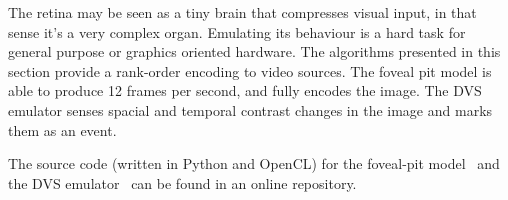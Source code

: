 The retina may be seen as a tiny brain that compresses visual input, in that sense it's a very complex organ. Emulating its behaviour is a hard task for general purpose or graphics oriented hardware. The algorithms presented in this section provide a rank-order encoding to video sources. The foveal pit model is able to produce 12 frames per second, and fully encodes the image. The DVS emulator senses spacial and temporal contrast changes in the image and marks them as an event. 

The source code (written in Python and OpenCL) for the foveal-pit model~\cite{focal-code} and the DVS emulator~\cite{pydvs-code} can be found in an online repository.
